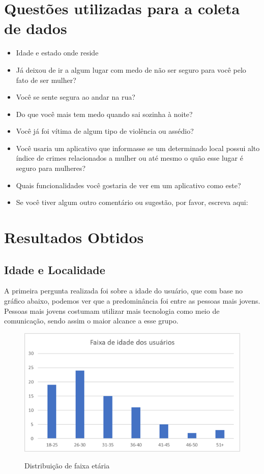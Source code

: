 \section{Questões utilizadas para a coleta de dados}
\begin{itemize}
  \item Idade e estado onde reside
  \item Já deixou de ir a algum lugar com medo de não ser seguro para você pelo fato de ser mulher?
  \item Você se sente segura ao andar na rua?
  \item Do que você mais tem medo quando sai sozinha à noite?
  \item Você já foi vítima de algum tipo de violência ou assédio?
  \item Você usaria um aplicativo que informasse se um determinado local possui alto índice de crimes relacionados a mulher ou até mesmo o quão esse lugar é seguro para mulheres?
  \item Quais funcionalidades você gostaria de ver em um aplicativo como este?
  \item Se você tiver algum outro comentário ou sugestão, por favor, escreva aqui:
\end{itemize}

\section{Resultados Obtidos}
\subsection{Idade e Localidade}
A primeira pergunta realizada foi sobre a idade do usuário, que com base no gráfico abaixo, podemos ver que a predominância foi entre as pessoas mais jovens. Pessoas mais jovens costumam utilizar mais tecnologia como meio de comunicação, sendo assim o maior alcance a esse grupo. 
\begin{figure}[H]
  \begin{center}
  \includegraphics[width=0.6\linewidth]{images/distribuicao-idade.png}\\
  \end{center}
  \caption[Distribuição de faixa etária]{Distribuição de faixa etária}
  \label{fig:mapa-empatia=inicial}
\end{figure}

